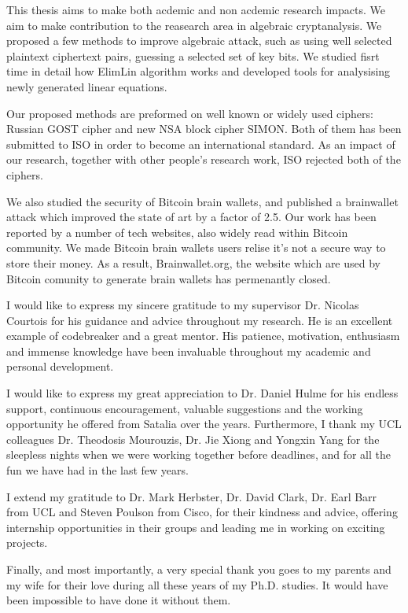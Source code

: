 \begin{impactstatement}
	This thesis aims to make both acdemic and non acdemic research impacts. We aim to make contribution to the reasearch area in algebraic cryptanalysis. We proposed a few methods to improve algebraic attack, such as using well selected plaintext ciphertext pairs, guessing a selected set of key bits. We studied fisrt time in detail how ElimLin algorithm works and developed tools for analysising newly generated linear equations. 
	
	Our proposed methods are preformed on well known or widely used ciphers: Russian GOST cipher and new NSA block cipher SIMON. Both of them has been submitted to ISO in order to become an international standard. As an impact of our research, together with other people's research work, ISO rejected both of the ciphers.
	
	We also studied the security of Bitcoin brain wallets, and published a brainwallet attack which improved the state of art by a factor of 2.5. Our work has been reported by a number of tech websites, also widely read within Bitcoin community. We made Bitcoin brain wallets users relise it's not a secure way to store their money. As a result, Brainwallet.org, the website which are used by Bitcoin comunity to generate brain wallets has permenantly closed.
	
\end{impactstatement}

\begin{acknowledgements}
I would like to express my sincere gratitude to my supervisor Dr. Nicolas Courtois for his guidance and advice throughout my research. He is an excellent example of codebreaker and a great mentor.  His patience, motivation, enthusiasm and immense knowledge have been invaluable throughout my academic and personal development.

I would like to express my great appreciation to Dr. Daniel Hulme for his endless support, continuous encouragement, valuable suggestions and the working opportunity he offered from Satalia over the years. Furthermore, I thank my UCL colleagues Dr. Theodosis Mourouzis, Dr. Jie Xiong and Yongxin Yang for the sleepless nights when we were working together before deadlines, and for all the fun we have had in the last few years.

I extend my gratitude to Dr. Mark Herbster, Dr. David Clark, Dr. Earl Barr from UCL and Steven Poulson from Cisco, for their kindness and advice, offering internship opportunities in their groups and leading me in working on exciting projects. 

Finally, and most importantly, a very special thank you goes to my parents and my wife for their love during all these years of my Ph.D. studies. It would have been impossible to have done it without them.

\end{acknowledgements}

\setcounter{tocdepth}{2} 

\tableofcontents
\listoffigures
\listoftables

